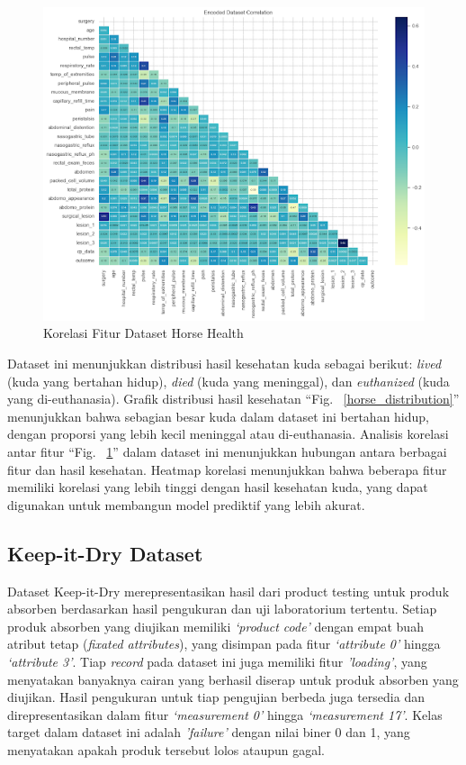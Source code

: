 \documentclass[conference]{IEEEtran}
\begin{document}
\begin{figure}[htbp]
    \centerline{\includegraphics[width=\linewidth, scale=0.5]{horse_corr.png}}
    \caption{Korelasi Fitur Dataset Horse Health}
    \label{horse_corr}
\end{figure}

Dataset ini menunjukkan distribusi hasil kesehatan kuda sebagai berikut: \textit{lived} (kuda yang bertahan hidup), \textit{died} (kuda yang meninggal), dan \textit{euthanized} (kuda yang di-euthanasia). 
Grafik distribusi hasil kesehatan ``Fig. ~\ref{horse_distribution}'' menunjukkan bahwa sebagian besar kuda dalam dataset ini bertahan hidup, dengan proporsi yang lebih kecil meninggal atau di-euthanasia. 
Analisis korelasi antar fitur ``Fig. ~\ref{horse_corr}'' dalam dataset ini menunjukkan hubungan antara berbagai fitur dan hasil kesehatan. Heatmap korelasi menunjukkan bahwa beberapa fitur memiliki korelasi 
yang lebih tinggi dengan hasil kesehatan kuda, yang dapat digunakan untuk membangun model prediktif yang lebih akurat.

\subsection{Keep-it-Dry Dataset}

Dataset Keep-it-Dry merepresentasikan hasil dari product testing untuk produk absorben berdasarkan hasil pengukuran dan uji laboratorium tertentu. Setiap produk absorben yang diujikan memiliki 
\textit{‘product code’} dengan empat buah atribut tetap (\textit{fixated attributes}), yang disimpan pada fitur \textit{‘attribute 0’} hingga \textit{‘attribute 3’}. Tiap \textit{record} pada dataset ini juga memiliki fitur \textit{'loading'}, yang 
menyatakan banyaknya cairan yang berhasil diserap untuk produk absorben yang diujikan. Hasil pengukuran untuk tiap pengujian berbeda juga tersedia dan direpresentasikan dalam fitur \textit{‘measurement 0’} 
hingga \textit{‘measurement 17’}. Kelas target dalam dataset ini adalah \textit{'failure'} dengan nilai biner 0 dan 1, yang menyatakan apakah produk tersebut lolos ataupun gagal.
\end{document}
